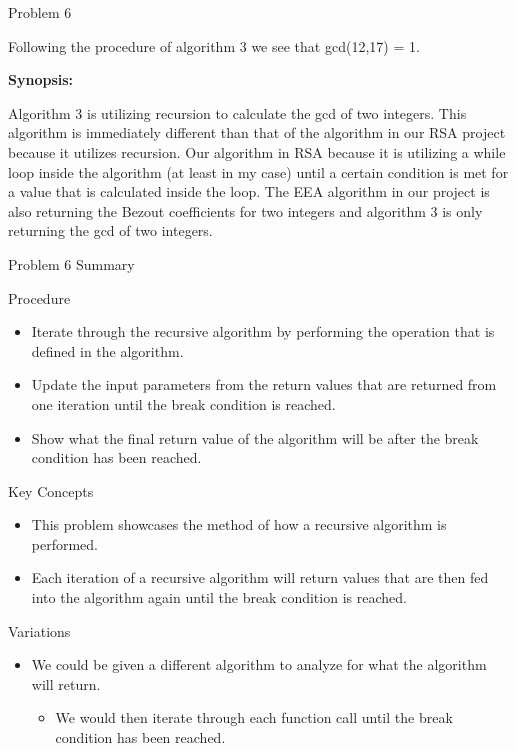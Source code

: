 \begin{problem}{Problem 6}
\begin{Highlight}[Solution - \#4]
\begin{enumerate}[label = \arabic*., start = 4]
            Following the procedure of algorithm 3 we see that gcd(12,17) = 1.
        \end{enumerate}

        \noindent \textbf{Synopsis:} \vspace*{1em}

        Algorithm 3 is utilizing recursion to calculate the gcd of two integers. This algorithm is immediately different than that of the algorithm in our RSA project because it utilizes recursion.
        Our algorithm in RSA because it is utilizing a while loop inside the algorithm (at least in my case) until a certain condition is met for a value that is calculated inside the loop. The EEA
        algorithm in our project is also returning the Bezout coefficients for two integers and algorithm 3 is only returning the gcd of two integers.
    \end{Highlight}
\end{problem}

\begin{summary}{Problem 6 Summary}
    \begin{statement}{Procedure}
        \begin{itemize}
            \item Iterate through the recursive algorithm by performing the operation that is defined in the algorithm.
            \item Update the input parameters from the return values that are returned from one iteration until the break condition is reached.
            \item Show what the final return value of the algorithm will be after the break condition has been reached.
        \end{itemize}
    \end{statement}
    \begin{statement}{Key Concepts}
        \begin{itemize}
            \item This problem showcases the method of how a recursive algorithm is performed.
            \item Each iteration of a recursive algorithm will return values that are then fed into the algorithm again until the break condition is reached.
        \end{itemize}
    \end{statement}
    \begin{statement}{Variations}
        \begin{itemize}
            \item We could be given a different algorithm to analyze for what the algorithm will return.
            \begin{itemize}
                \item We would then iterate through each function call until the break condition has been reached.
            \end{itemize}
        \end{itemize}
    \end{statement}
\end{summary}

